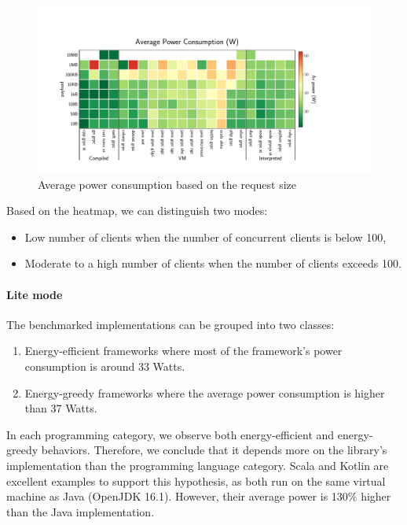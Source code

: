 \begin{figure}[!hbt]
    \begin{center}
        \includegraphics[width=1.2\linewidth]{imgs/power_consumption_payload}
    \end{center}
    \caption{Average power consumption based on the request size}\label{fig:power_consumption_payload}
\end{figure}

Based on the heatmap, we can distinguish two modes:
\begin{itemize}
    \item \textsf{Low number of clients} when the number of concurrent clients is below 100,
    \item \textsf{Moderate to a high number of clients} when the number of clients exceeds 100.
\end{itemize}


\paragraph{Lite mode}
The benchmarked implementations can be grouped into two classes:
\begin{enumerate}
    \item \textsf{Energy-efficient frameworks} where most of the framework's power consumption is around 33 Watts.
    \item \textsf{Energy-greedy frameworks} where the average power consumption is higher than 37 Watts.
\end{enumerate}

In each programming category, we observe both energy-efficient and energy-greedy behaviors.
Therefore, we conclude that it depends more on the library's implementation than the programming language category.
Scala and Kotlin are excellent examples to support this hypothesis, as both run on the same virtual machine as Java (OpenJDK 16.1).
However, their average power is 130\% higher than the Java implementation.

